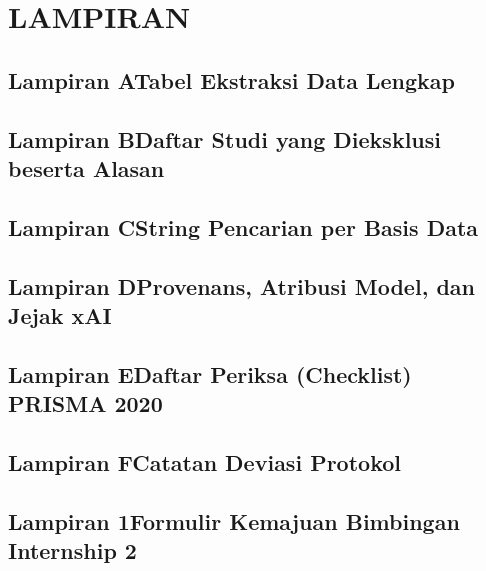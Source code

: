 \documentclass[12pt,a4paper,oneside]{report}
\begin{document}
\renewcommand{\thepage}{\arabic{page}}   %



\chapter*{LAMPIRAN}

\section*{Lampiran A\quad Tabel Ekstraksi Data Lengkap}

\section*{Lampiran B\quad Daftar Studi yang Dieksklusi beserta Alasan}

\section*{Lampiran C\quad String Pencarian per Basis Data}

\section*{Lampiran D\quad Provenans, Atribusi Model, dan Jejak xAI}

\section*{Lampiran E\quad Daftar Periksa (Checklist) PRISMA 2020}

\section*{Lampiran F\quad Catatan Deviasi Protokol}

\section*{Lampiran 1\quad Formulir Kemajuan Bimbingan Internship 2}
\end{document}
